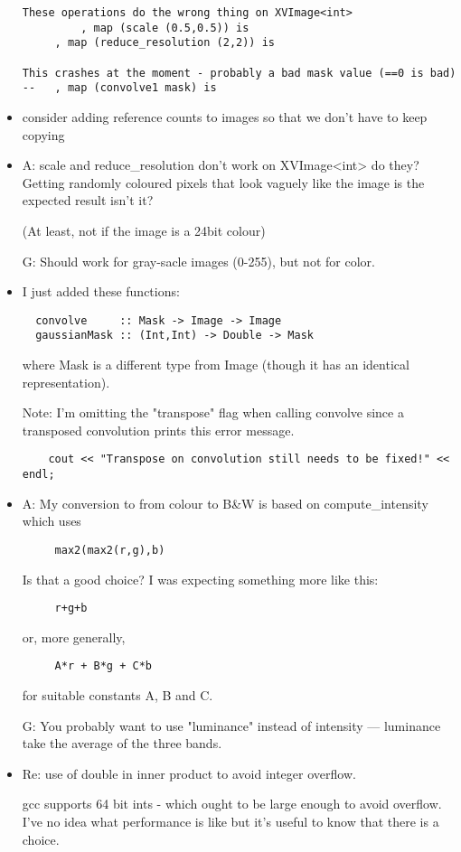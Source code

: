 \begin{itemize}
\begin{verbatim}
These operations do the wrong thing on XVImage<int>
         , map (scale (0.5,0.5)) is
	 , map (reduce_resolution (2,2)) is

This crashes at the moment - probably a bad mask value (==0 is bad)
--	 , map (convolve1 mask) is
\end{verbatim}

\item
  consider adding reference counts to images so that we don't
  have to keep copying

\item
A:
  scale and reduce\_resolution don't work on XVImage<int> do they?
  Getting randomly coloured pixels that look vaguely like the image
  is the expected result isn't it?

  (At least, not if the image is a 24bit colour)

G:
  Should work for gray-sacle images (0-255), but not for color.

\item
I just added these functions:
\begin{verbatim}
  convolve     :: Mask -> Image -> Image
  gaussianMask :: (Int,Int) -> Double -> Mask
\end{verbatim}

where Mask is a different type from Image (though it has an identical
representation).

Note: I'm omitting the "transpose" flag when calling convolve since 
a transposed convolution prints this error message.
\begin{verbatim}
    cout << "Transpose on convolution still needs to be fixed!" << endl;
\end{verbatim}

\item
A:
  My conversion to from colour to B\&W is based on compute\_intensity
   which uses   
\begin{verbatim}
     max2(max2(r,g),b)
\end{verbatim}
  Is that a good choice?  I was expecting something more like this:
\begin{verbatim}
     r+g+b
\end{verbatim}
  or, more generally,
\begin{verbatim}
     A*r + B*g + C*b
\end{verbatim}
  for suitable constants A, B and C.

G:
   You probably want to use "luminance" instead of intensity ---
luminance take the average of the three bands.

\item
Re: use of double in inner product to avoid integer overflow.

gcc supports 64 bit ints - which ought to be large enough to avoid
overflow.  I've no idea what performance is like but it's useful to
know that there is a choice.

\end{itemize}


